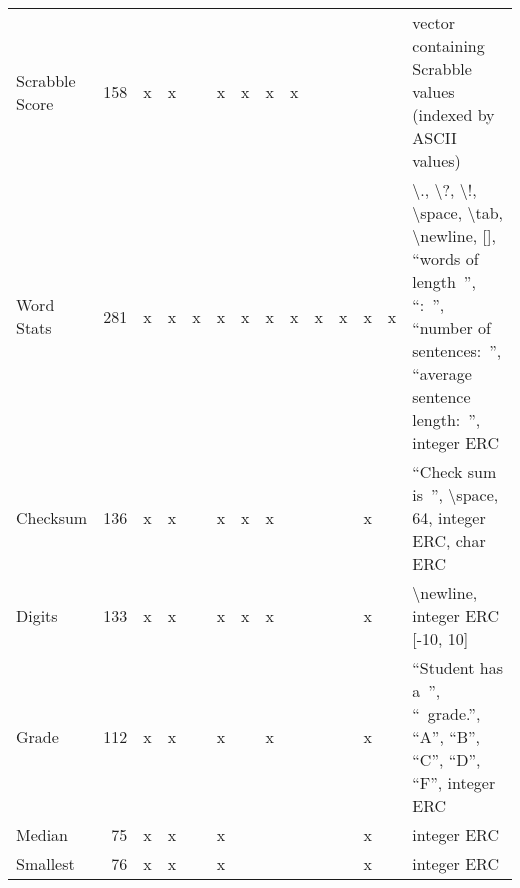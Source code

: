 \documentclass{sig-alternate}
\begin{document}
\begin{table*}
\begin{tabular}{>{\raggedright}p{2.6cm}rccccccccccc>{\raggedright}p{5.5cm}}
Scrabble Score             & 158             & x    & x       &       & x       & x    & x      & x                  &                  &                   &       &            & vector containing Scrabble values (indexed by ASCII values)                                                                                                                                                                 \tabularnewline
Word Stats                 & 281             & x    & x       & x     & x       & x    & x      & x                  & x                & x                 & x     & x          & \textbackslash ., \textbackslash ?, \textbackslash !, \textbackslash space, \textbackslash tab, \textbackslash newline, {[}{]}, ``words of length~'', ``:~'', ``number of sentences:~'', ``average sentence length:~'', integer ERC \tabularnewline
Checksum                   & 136             & x    & x       &       & x       & x    & x      &                    &                  &                   & x     &            & ``Check sum is~'', \textbackslash space, 64, integer ERC, char ERC                                                                                                                                                            \tabularnewline
Digits                     & 133             & x    & x       &       & x       & x    & x      &                    &                  &                   & x     &            & \textbackslash newline, integer ERC {[}-10, 10{]}                                                                                                                                                                           \tabularnewline
Grade                      & 112             & x    & x       &       & x       &      & x      &                    &                  &                   & x     &            & ``Student has a~'', ``~grade.'', ``A'', ``B'', ``C'', ``D'', ``F'', integer ERC                                                                                                                                                           \tabularnewline
Median                     & 75              & x    & x       &       & x       &      &        &                    &                  &                   & x     &            & integer ERC                                                                                                                                                                                                                 \tabularnewline
Smallest                   & 76              & x    & x       &       & x       &      &        &                    &                  &                   & x     &            & integer ERC                                                                                                                                                                                                                 \tabularnewline

\end{tabular}
\end{table*}
\end{document}
